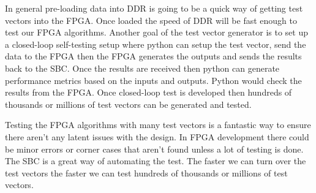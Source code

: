 In general pre-loading data into \ac{DDR} is going to be a quick way of getting test vectors into the \ac{FPGA}. Once loaded the speed of \ac{DDR} will be fast enough to test our \ac{FPGA} algorithms. Another goal of the test vector generator is to set up a closed-loop self-testing setup where python can setup the test vector, send the data to the \ac{FPGA} then the \ac{FPGA} generates the outputs and sends the results back to the \ac{SBC}. Once the results are received then python can generate performance metrics based on the inputs and outputs. Python would check the results from the \ac{FPGA}. Once closed-loop test is developed then hundreds of thousands or millions of test vectors can be generated and tested.

Testing the \ac{FPGA} algorithms with many test vectors is a fantastic way to ensure there aren't any latent issues with the design. In \ac{FPGA} development there could be minor errors or corner cases that aren't found unless a lot of testing is done. The \ac{SBC} is a great way of automating the test. The faster we can turn over the test vectors the faster we can test hundreds of thousands or millions of test vectors. 

